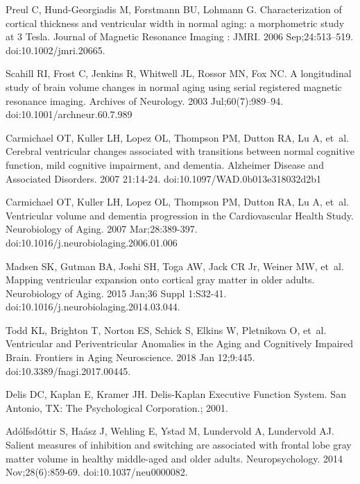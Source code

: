 \documentclass[10pt,letterpaper]{article}
\begin{document}
\begin{thebibliography}{10}
Preul C, Hund-Georgiadis M, Forstmann BU, Lohmann G.
\newblock Characterization of cortical thickness and ventricular width in normal aging: a morphometric study at 3 Tesla.
\newblock Journal of Magnetic Resonance Imaging : JMRI. 2006 Sep;24:513--519. doi:10.1002/jmri.20665.

Scahill RI, Frost C, Jenkins R, Whitwell JL, Rossor MN, Fox NC.
\newblock A longitudinal study of brain volume changes in normal aging using serial registered magnetic resonance imaging.
\newblock Archives of Neurology. 2003 Jul;60(7):989--94. doi:10.1001/archneur.60.7.989


Carmichael OT, Kuller LH, Lopez OL, Thompson PM, Dutton RA, Lu A, et~al.
\newblock Cerebral ventricular changes associated with transitions between normal cognitive function, mild cognitive impairment, and dementia.
\newblock Alzheimer Disease and Associated Disorders. 2007 21:14-24. doi:10.1097/WAD.0b013e318032d2b1

Carmichael OT, Kuller LH, Lopez OL, Thompson PM, Dutton RA, Lu A, et~al.
\newblock Ventricular volume and dementia progression in the Cardiovascular Health Study.
\newblock Neurobiology of Aging. 2007 Mar;28:389-397. doi:10.1016/j.neurobiolaging.2006.01.006

Madsen SK, Gutman BA, Joshi SH, Toga AW, Jack CR Jr, Weiner MW, et~al.
\newblock Mapping ventricular expansion onto cortical gray matter in older adults.
\newblock Neurobiology of Aging. 2015 Jan;36 Suppl 1:S32-41. doi:10.1016/j.neurobiolaging.2014.03.044.

Todd KL, Brighton T, Norton ES, Schick S, Elkins W, Pletnikova O, et~al.
\newblock Ventricular and Periventricular Anomalies in the Aging and Cognitively Impaired Brain.
\newblock Frontiers in Aging Neuroscience. 2018 Jan 12;9:445. doi:10.3389/fnagi.2017.00445.

Delis DC, Kaplan E, Kramer JH.
\newblock Delis-Kaplan Executive Function System.
\newblock San Antonio, TX: The Psychological Corporation.; 2001.

Ad{\'o}lfsd{\'o}ttir S, Ha{\'a}sz J, Wehling E, Ystad M, Lundervold A, Lundervold AJ.
\newblock Salient measures of inhibition and switching are associated with frontal lobe gray matter volume in healthy middle-aged and older adults.
\newblock Neuropsychology. 2014 Nov;28(6):859-69. doi:10.1037/neu0000082. 



\end{thebibliography}
\end{document}
